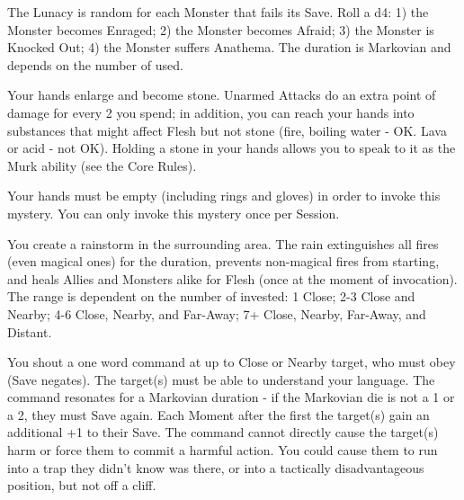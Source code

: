 {The Lunacy is random for each Monster that fails its Save.  Roll a d4:  1) the Monster becomes Enraged; 2) the Monster becomes Afraid; 3) the Monster is Knocked Out; 4) the Monster suffers Anathema.  The duration is Markovian and depends on the number of \DICE used.

\MYSTERY [
  Name = Mountainhands,
  Link = arcana-mystery-mountainhands,
  Paradigm = Biomancy,
  Save = N,
  Duration = Session,
  Target = Self
]

Your hands enlarge and become stone.  Unarmed Attacks do an extra point of damage for every 2 \DICE you spend; in addition, you can reach your hands into substances that might affect Flesh but not stone (fire, boiling water - OK.  Lava or acid - not OK).  Holding a stone in your hands allows you to speak to it as the Murk ability (see the Core Rules). 

Your hands must be empty (including rings and gloves) in order to invoke this mystery. You can only invoke this mystery once per Session.

\MYSTERY [
  Name = Rainburst,
  Link = arcana-mystery-rainburst,
  Paradigm = Elements,
  Save = n/a,
  Duration = Combat or \SUM Minutes,
  Target = See Below
]

You create a rainstorm in the surrounding area.  The rain extinguishes all fires (even magical ones) for the duration, prevents non-magical fires from starting, and heals Allies and Monsters alike for \SUMDICE Flesh (once at the moment of invocation).  The range is dependent on the number of \DICE invested: 1 Close; 2-3 Close and Nearby; 4-6 Close, Nearby, and Far-Away; 7+ Close, Nearby, Far-Away, and Distant.

\MYSTERY [
  Name = Resonating Command,
  Link = arcana-mystery-resonating-command,
  Paradigm = Mind,
  Save = Y (neg.),
  Duration = Markovian,
  Target = Nearby Target(s)
]

You shout a one word command at up to \DICE Close or Nearby target, who must obey (Save negates).  The target(s) must be able to understand your language.  The command resonates for a Markovian duration - if the Markovian die is not a 1 or a 2, they must Save again.  Each Moment after the first the target(s) gain an additional +1 to their Save.  The command cannot directly cause the target(s) harm or force them to commit a harmful action.  You could cause them to run into a trap they didn't know was there, or into a tactically disadvantageous position, but not off a cliff.

\MYSTERY [
  Name = Thunderclap,
  Link = arcana-mystery-thunderclap,
  Paradigm = Elements,
  Save = Y (neg.),
  Duration = Instant,
  Target = Far-Away or Distant
]

}
